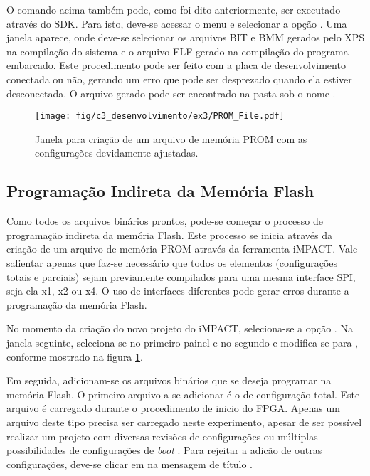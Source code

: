 \documentclass[11pt,a4paper,oneside]{book}
\begin{document}
O comando acima também pode, como foi dito anteriormente, ser executado através do SDK.
Para isto, deve-se acessar o menu  e selecionar a opção .
Uma janela aparece, onde deve-se selecionar os arquivos BIT e BMM gerados pelo XPS na compilação do sistema e o arquivo ELF gerado na compilação do programa embarcado.
Este procedimento pode ser feito com a placa de desenvolvimento conectada ou não, gerando um erro que pode ser desprezado quando ela estiver desconectada.
O arquivo gerado pode ser encontrado na pasta  sob o nome .

\begin{figure}[htp]
\centering
\texttt{[image: fig/c3\_desenvolvimento/ex3/PROM\_File.pdf]}
\caption{Janela para criação de um arquivo de memória PROM com as configurações devidamente ajustadas.}
\label{fig:ex3:prom_file}
\end{figure}

\subsection{Programação Indireta da Memória Flash}
Como todos os arquivos binários prontos, pode-se começar o processo de programação indireta da memória Flash.
Este processo se inicia através da criação de um arquivo de memória PROM através da ferramenta iMPACT.
Vale salientar apenas que faz-se necessário que todos os elementos (configurações totais e parciais) sejam previamente compilados para uma mesma interface SPI, seja ela x1, x2 ou x4.
O uso de interfaces diferentes pode gerar erros durante a programação da memória Flash.

No momento da criação do novo projeto do iMPACT, seleciona-se a opção .
Na janela seguinte, seleciona-se  no primeiro painel e  no segundo e modifica-se  para , conforme mostrado na figura \ref{fig:ex3:prom_file}.

Em seguida, adicionam-se os arquivos binários que se deseja programar na memória Flash.
O primeiro arquivo a se adicionar é o de configuração total.
Este arquivo é carregado durante o procedimento de inicio do FPGA.
Apenas um arquivo deste tipo precisa ser carregado neste experimento, apesar de ser possível realizar um projeto com diversas revisões de configurações ou múltiplas possibilidades de configurações de \textit{boot} \cite{xapp468, xapp1100}.
Para rejeitar a adicão de outras configurações, deve-se clicar em  na mensagem de título .
\end{document}
